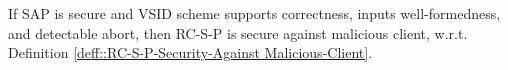 %  
%     
%     
   




\begin{lemma}
 If SAP is secure and  VSID scheme supports correctness, inputs well-formedness, and detectable abort, then RC-S-P is secure against malicious client, w.r.t. Definition \ref{deff::RC-S-P-Security-Against Malicious-Client}. 
\end{lemma}



